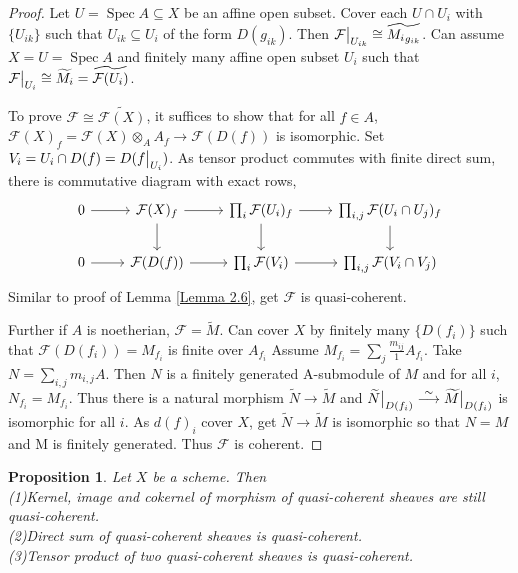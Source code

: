 \documentclass{ctexart}
\newtheorem{proposition}{Proposition}[section]
\newcommand{\spec}{\operatorname{Spec}}
\begin{document}
\begin{proof}
    Let $U = \spec A \subseteq X$ be an affine open subset.
    Cover each $U \cap U_{i}$ with $\{U_{ik}\}$ such that $U_{ik} \subseteq U_{i}$ of the form $D(g_{ik})$.
    Then $\mathcal{F}\big{|}_{U_{ik}} \cong \widetilde{{M_{i}}_{g_{ik}}}$.
    Can assume $X = U = \spec A$ and finitely many affine open subset $U_{i}$ such that $\mathcal{F}\big{|}_{U_{i}} \cong \widetilde{M_{i}} = \widetilde{\mathcal{F}(U_{i})}$.
    \par
    To prove $\mathcal{F} \cong \widetilde{\mathcal{F}(X)}$, it suffices to show that for all $f\in A$, $\mathcal{F}(X)_{f} = \mathcal{F}(X) \otimes_{A} A_{f} \longrightarrow \mathcal{F}(D(f))$ is isomorphic.
    Set $V_{i} = U_{i} \cap D(f) = D(f\big{|}_{U_{i}})$.
    As tensor product commutes with finite direct sum, there is commutative diagram with exact rows,
    \begin{equation*}
        \begin{tikzcd}
            0 \arrow[r] &
            \mathcal{F}(X)_{f} \arrow[r] \arrow[d] &
            \prod_{i} \mathcal{F}(U_{i})_{f} \arrow[r] \arrow[d] &
            \prod_{i,j} \mathcal{F}(U_{i} \cap U_{j})_{f} \arrow[d] \\
            0 \arrow[r] &
            \mathcal{F}(D(f)) \arrow[r] &
            \prod_{i} \mathcal{F}(V_{i}) \arrow[r] &
            \prod_{i,j} \mathcal{F}(V_{i} \cap V_{j})
        \end{tikzcd}
    \end{equation*}
    Similar to proof of Lemma \ref{Lemma 2.6}, get $\mathcal{F}$ is quasi-coherent.
    \par
    Further if $A$ is noetherian, $\mathcal{F} = \widetilde{M}$.
    Can cover $X$ by finitely many $\{D(f_{i})\}$ such that $\mathcal{F}(D(f_{i})) = M_{f_{i}}$ is finite over $A_{f_{i}}$
    Assume $M_{f_{i}} = \sum_{j} \frac{m_{ij}}{1}A_{f_{i}}$.
    Take $N = \sum_{i,j} m_{i,j}A$.
    Then $N$ is a finitely generated A-submodule of $M$ and for all $i$, $N_{f_{i}} = M_{f_{i}}$.
    Thus there is a natural morphism $\widetilde{N} \longrightarrow \widetilde{M}$ and $\widetilde{N}\big{|}_{D(f_{i})} \overset{\sim}{\longrightarrow} \widetilde{M}\big{|}_{D(f_{i})}$ is isomorphic for all $i$.
    As $d(f)_{i}$ cover $X$, get $\widetilde{N} \longrightarrow \widetilde{M}$ is isomorphic so that $N = M$ and M is finitely generated.
    Thus $\mathcal{F}$ is coherent.
\end{proof}
\begin{proposition}
    Let $X$ be a scheme.
    Then \\
    (1)Kernel, image and cokernel of morphism of quasi-coherent sheaves are still quasi-coherent. \\
    (2)Direct sum of quasi-coherent sheaves is quasi-coherent. \\
    (3)Tensor product of two quasi-coherent sheaves is quasi-coherent.
    \label{Proposition 6.3}
\end{proposition}
\end{document}
